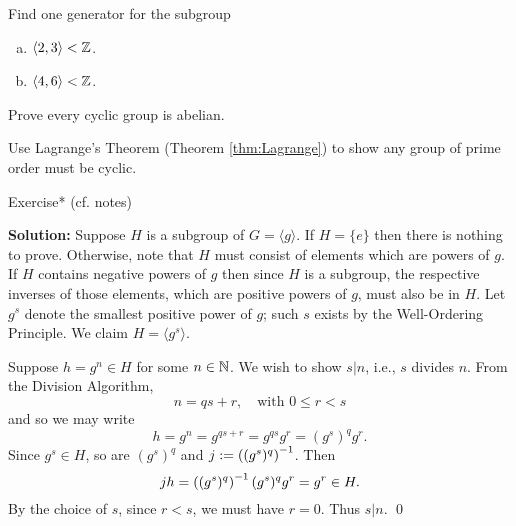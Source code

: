 \documentclass[../algebraNotesMSRI-UP2016.tex]{subfiles}
\begin{document}
\begin{frame}
\begin{exe}[cf. Problem 58]\label{exe:prob58}
Find one generator for the subgroup
\begin{enumerate}[(a)]
\item $\langle 2,3\rangle< \mathbb Z$.
\item $\langle 4,6\rangle< \mathbb Z$.
\end{enumerate} 
\end{exe}

\smallGap
\begin{exe}[cf. Problem 59]\label{exe:prob59}
Prove every cyclic group is abelian.
\end{exe}
%
%

\smallGap
\begin{exe}[cf. Problem 60]\label{exe:prob60}
Use Lagrange's Theorem (Theorem \ref{thm:Lagrange}) to show any group of prime order must be cyclic.
\end{exe}
\end{frame}

\answerKey
\begin{frame}{\subsecname}
\begin{block}{Exercise* (cf. notes)}
\end{block}
\vspace{-0.75pc}
\textbf{Solution:}
Suppose $H$ is a subgroup of $G=\langle g\rangle$.  If $H=\{e\}$ then there is nothing to prove.  Otherwise, note that $H$ must consist of elements which are powers of $g$.  If $H$ contains negative powers of $g$ then since $H$ is a subgroup, the respective inverses of those elements, which are positive powers of $g$, must also be in $H$.  Let $g^s$ denote the smallest positive power of $g$; such $s$ exists by the Well-Ordering Principle.  We claim $H=\langle g^s\rangle$.

\smallGap
Suppose $h=g^n\in H$ for some $n\in \mathbb N$.  We wish to show $s|n$, i.e., $s$ divides $n$.  From the Division Algorithm,
\[
n=qs+r,\quad\text{with $0\leq r<s$}
\]
and so we may write 
\[
h=g^n=g^{qs+r}=g^{qs}g^{r}=(g^s)^qg^r.
\]
Since $g^s\in H$, so are $(g^s)^q$ and $j:=\left((g^s)^q\right)^{-1}$.  Then 
\[
jh=\left((g^s)^q\right)^{-1}(g^s)^qg^r = g^r\in H.
\]
By the choice of $s$, since $r<s$, we must have $r=0$.  Thus $s|n$.
\qed
\end{frame}
\end{document}
